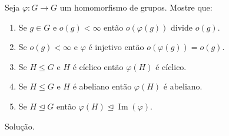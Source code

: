 \begin{homeworkProblem}
  Seja $\varphi : G \to G$ um homomorfismo de grupos. Mostre que:
\begin{enumerate}
    \item Se $g \in G$ e $o(g) < \infty$ então $o(\varphi(g))$ divide $o(g)$.
    \item Se $o(g) < \infty$ e $\varphi$ é injetivo então $o(\varphi(g)) = o(g)$.
    \item Se $H \leq G$ e $H$ é cíclico então $\varphi(H)$ é cíclico.
    \item Se $H \leq G$ e $H$ é abeliano então $\varphi(H)$ é abeliano.
    \item Se $H \trianglelefteq G$ então $\varphi(H) \trianglelefteq \operatorname{Im}(\varphi)$.
\end{enumerate}
  \begin{solution}
    Solução.
  \end{solution}
\end{homeworkProblem}
